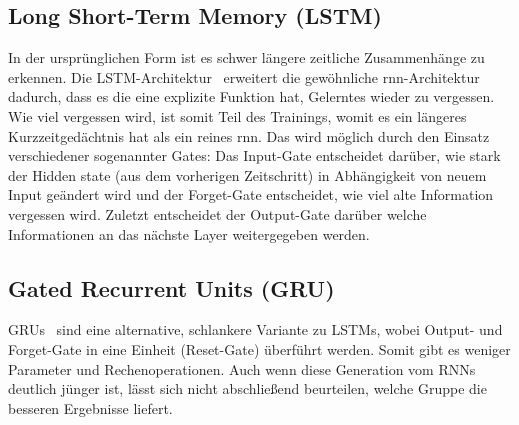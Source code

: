 \subsection*{Long Short-Term Memory (LSTM)}

In der ursprünglichen Form ist es schwer längere zeitliche Zusammenhänge zu erkennen.
Die LSTM-Architektur~\cite{Hochreiter97} erweitert die gewöhnliche \gls{rnn}-Architektur dadurch, dass es die eine explizite Funktion hat, Gelerntes wieder zu vergessen.
Wie viel vergessen wird, ist somit Teil des Trainings, womit es ein längeres Kurzzeitgedächtnis hat als ein reines \gls{rnn}.
Das wird möglich durch den Einsatz verschiedener sogenannter Gates:
Das Input-Gate entscheidet darüber, wie stark der Hidden state (aus dem vorherigen Zeitschritt) in Abhängigkeit von neuem Input geändert wird und der Forget-Gate entscheidet, wie viel alte Information vergessen wird.
Zuletzt entscheidet der Output-Gate darüber welche Informationen an das nächste Layer weitergegeben werden.

\subsection*{Gated Recurrent Units (GRU)}

GRUs~\cite{Cho14} sind eine alternative, schlankere Variante zu LSTMs, wobei Output- und Forget-Gate in eine Einheit (Reset-Gate) überführt werden.
Somit gibt es weniger Parameter und Rechenoperationen.
Auch wenn diese Generation vom RNNs deutlich jünger ist, lässt sich nicht abschließend beurteilen, welche Gruppe die besseren Ergebnisse liefert.

